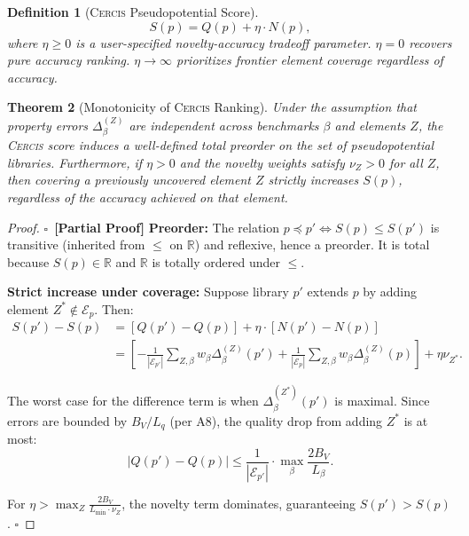\documentclass[11pt,a4paper]{article}
\newtheorem{theorem}{Theorem}[section]
\newtheorem{definition}[theorem]{Definition}
\theoremstyle{definition}
\newcommand{\rigorPartial}[0]{$\square$~\textbf{[Partial Proof]}}
\newcommand{\Cercis}{\textsc{Cercis}}
\newcommand{\R}{\mathbb{R}}
\begin{document}
\begin{definition}[\Cercis{} Pseudopotential Score]\label{def:cercis}
\begin{equation}\label{eq:S}
S(p) = Q(p) + \eta \cdot N(p),
\end{equation}
where $\eta \geq 0$ is a user-specified novelty-accuracy tradeoff parameter. $\eta = 0$ recovers pure accuracy ranking. $\eta \to \infty$ prioritizes frontier element coverage regardless of accuracy.
\end{definition}

\begin{theorem}[Monotonicity of \Cercis{} Ranking]\label{thm:cercis_monotonicity}
Under the assumption that property errors $\Delta_\beta^{(Z)}$ are independent across benchmarks $\beta$ and elements $Z$, the \Cercis{} score induces a well-defined total preorder on the set of pseudopotential libraries. Furthermore, if $\eta > 0$ and the novelty weights satisfy $\nu_Z > 0$ for all $Z$, then covering a previously uncovered element $Z$ \textit{strictly increases} $S(p)$, regardless of the accuracy achieved on that element.
\end{theorem}

\begin{proof}\rigorPartial
\textbf{Preorder:} The relation $p \preceq p' \iff S(p) \leq S(p')$ is transitive (inherited from $\leq$ on $\R$) and reflexive, hence a preorder. It is total because $S(p) \in \R$ and $\R$ is totally ordered under $\leq$.

\textbf{Strict increase under coverage:} Suppose library $p'$ extends $p$ by adding element $Z^* \notin \mathcal{E}_p$. Then:
\begin{align}
S(p') - S(p) &= [Q(p') - Q(p)] + \eta \cdot [N(p') - N(p)] \\
&= \left[-\frac{1}{|\mathcal{E}_{p'}|} \sum_{Z,\beta} w_\beta \Delta_\beta^{(Z)}(p') + \frac{1}{|\mathcal{E}_p|} \sum_{Z,\beta} w_\beta \Delta_\beta^{(Z)}(p) \right] + \eta \nu_{Z^*}.
\end{align}

The worst case for the difference term is when $\Delta_\beta^{(Z^*)}(p')$ is maximal. Since errors are bounded by $B_V/L_q$ (per A8), the quality drop from adding $Z^*$ is at most:
\begin{equation}
|Q(p') - Q(p)| \leq \frac{1}{|\mathcal{E}_{p'}|} \cdot \max_{\beta} \frac{2B_V}{L_\beta}.
\end{equation}

For $\eta > \max_{Z} \frac{2B_V}{L_{\min} \cdot \nu_Z}$, the novelty term dominates, guaranteeing $S(p') > S(p)$. $\square$
\end{proof}
\end{document}
